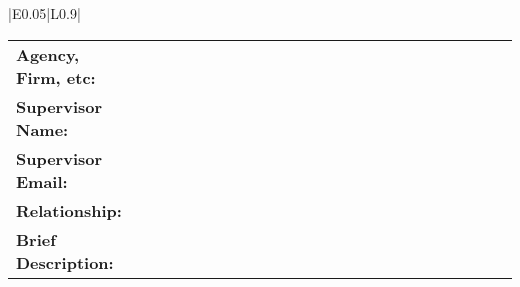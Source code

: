 {\begin{tabularx}{\linewidth}{ |E{0.05\linewidth}|L{0.9\linewidth}|}
		\begin{tabular}[t]{m{0.2\linewidth}p{0.8\linewidth}}
			\setlength\tabcolsep{10pt}
			\textbf{ Agency, Firm, etc: } & \TextField[name=project_agency,width=0.8\linewidth,charsize=10pt,bordercolor=0 0 0,borderstyle=U]{}                               \\[5pt]
			\textbf{ Supervisor Name: }   & \TextField[name=project_supervisor,width=0.8\linewidth,charsize=10pt,bordercolor=0 0 0,borderstyle=U]{}                           \\[5pt]
			\textbf{ Supervisor Email: }  & \TextField[name=project_supervisor_email,width=0.8\linewidth,bordercolor=0 0 0,borderstyle=U,charsize=10pt]{}                     \\[5pt]
			\textbf{ Relationship: }      & \ChoiceMenu[combo,name=project_supervisor_rel,width=0.4\linewidth,bordercolor=0.5 0.5 0.5]{}{Academic, Professional, Other, None} \\[5pt]
			\textbf{Brief Description:}   & \TextField[name=project_desc,width=0.8\linewidth,charsize=10pt,bordercolor=0 0 0,multiline,height=.6in]{}                         \\[5pt]
		\end{tabular}                                                                                                                                           \\

		\hline
	\end{tabularx}\\
}

